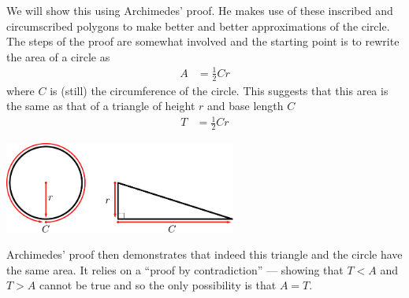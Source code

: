 We will show this using Archimedes' proof. He makes use of these inscribed and circumscribed polygons to make better and better approximations of the circle. The steps of the proof are somewhat involved and the starting point is to rewrite the area of a circle as
\begin{align*}
  A &= \frac{1}{2} C r
\end{align*}
where $C$ is (still) the circumference of the circle. This suggests that this
area is the same as that of a triangle of height $r$ and base
length $C$
\begin{align*}
  T &= \frac{1}{2} C r
\end{align*}
\begin{center}
 \includegraphics[height=3cm]{archimedes1}
\end{center}
Archimedes' proof then demonstrates that indeed this triangle and the circle have the same
area. It relies on a ``proof by contradiction'' --- showing that $T<A$ and $T>A$ cannot
be true and so the only possibility is that $A=T$.

